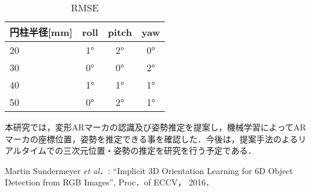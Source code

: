 \documentclass{jsarticle}
\begin{document}






\begin{table}[h]
        \vspace{-1.8zh}
          \begin{center}
            \caption{RMSE}
            \label{hyouka}
            \begin{tabular}{l|c|c|c} \hline
              円柱半径[mm]   & roll& pitch & yaw \\ \hline
 20  & 1° & 2° & 0° \\ \hline
              30  & 0° & 0° & 2° \\ \hline
              40  & 1° & 1° & 1° \\ \hline
              50  & 0°& 2° & 1° \\ \hline
              \end{tabular}
          \end{center}
        \vspace{-1.0zh}
\end{table}






本研究では，変形ARマーカの認識及び姿勢推定を提案し，機械学習によってARマーカの座標位置，姿勢を推定できる事を確認した．今後は，提案手法のよるリアルタイムでの三次元位置・姿勢の推定を研究を行う予定である．

%
%
%

\begin{thebibliography}{1}

{\scriptsize 
{}
Martin Sundermeyer {\em et al．}: ``Implicit 3D Orientation Learning for 6D Object Detection from RGB Images'', 
Proc．of ECCV， 2016．}

\end{thebibliography}
\end{document}
